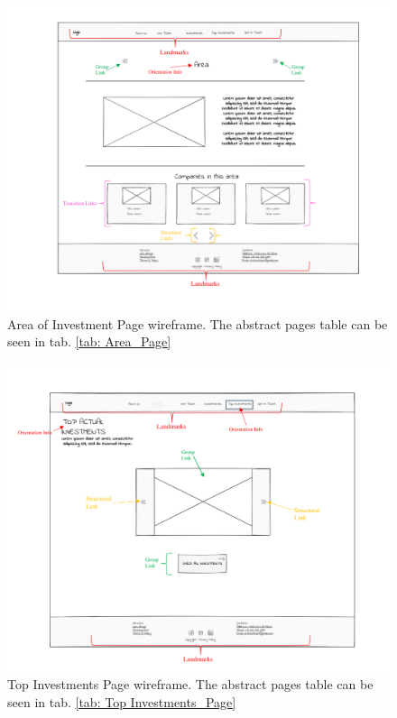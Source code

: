 \begin{figure}[!htb]
     \centering
     \includegraphics[width=\textwidth]{Images/Wireframes/area wireframe.png}
     \caption{Area of Investment Page wireframe. The abstract pages table can be seen in tab. \ref{tab: Area_Page}}
     \label{fig: area-wireframe}
 \end{figure}

 \begin{figure}[!htb]
     \centering
     \includegraphics[width=\textwidth]{Images/Wireframes/top investments wireframe.png}
     \caption{Top Investments Page wireframe. The abstract pages table can be seen in tab. \ref{tab: Top Investments_Page}}
     \label{fig: topinvestments-wireframe}
 \end{figure}

